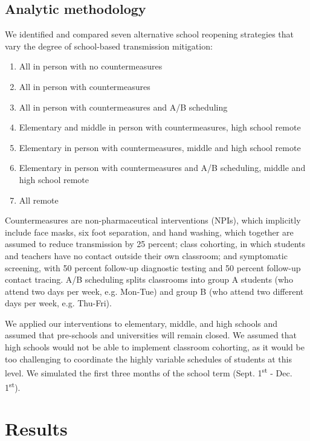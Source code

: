 \documentclass[preprint,12pt]{elsarticle}
\begin{document}
\subsection{Analytic methodology}

We identified and compared seven alternative school reopening strategies that vary the degree of school-based transmission mitigation:
\begin{enumerate}
    \item All in person with no countermeasures
    \item All in person with countermeasures
    \item All in person with countermeasures and A/B scheduling
    \item Elementary and middle in person with countermeasures, high school remote
    \item Elementary in person with countermeasures, middle and high school remote
    \item Elementary in person with countermeasures and A/B scheduling, middle and high school remote
    \item All remote
\end{enumerate}

Countermeasures are non-pharmaceutical interventions (NPIs), which implicitly include face masks, six foot separation, and hand washing, which together are assumed to reduce transmission by 25 percent; class cohorting, in which students and teachers have no contact outside their own classroom; and symptomatic screening, with 50 percent follow-up diagnostic testing and 50 percent follow-up contact tracing. A/B scheduling splits classrooms into group A students (who attend two days per week, e.g. Mon-Tue) and group B (who attend two different days per week, e.g. Thu-Fri).

We applied our interventions to elementary, middle, and high schools and assumed that pre-schools and universities will remain closed. We assumed that high schools would not be able to implement classroom cohorting, as it would be too challenging to coordinate the highly variable schedules of students at this level. We simulated the first three months of the school term (Sept. 1\textsuperscript{st} - Dec. 1\textsuperscript{st}).

\section{Results}
\end{document}

